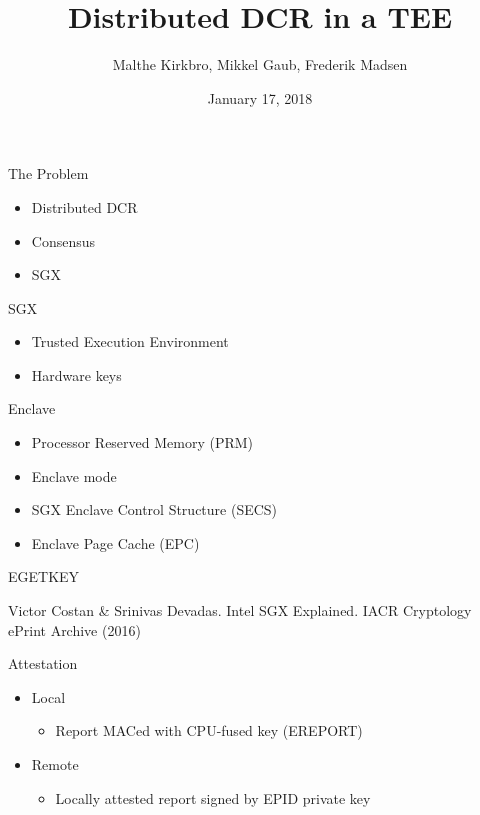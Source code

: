 \documentclass{beamer}
\title{Distributed DCR in a TEE}
\author{Malthe Kirkbro, Mikkel Gaub, Frederik Madsen}
\date{January 17, 2018}
\begin{document}


	\begin{frame}
		\maketitle
	\end{frame}

	\begin{frame}{The Problem} %
		\begin{itemize}
			\item Distributed DCR
			\item Consensus
			\item SGX
		\end{itemize}
	\end{frame}

	\begin{frame}{SGX} %
		\begin{itemize}
			\item Trusted Execution Environment
			\item Hardware keys
		\end{itemize}
	\end{frame}

	\begin{frame}{Enclave} %
		\begin{itemize}
			\item Processor Reserved Memory (PRM)
			\item Enclave mode
			\item SGX Enclave Control Structure (SECS)
			\item Enclave Page Cache (EPC)
		\end{itemize}
	\end{frame}

	\begin{frame}{EGETKEY}
		

		\center\fontsize{4pt}{1}\selectfont
		Victor Costan \& Srinivas Devadas. Intel SGX Explained. IACR Cryptology ePrint Archive (2016)
	\end{frame}

	\begin{frame}{Attestation} %
		\begin{itemize}
			\item Local
				\begin{itemize}
					\item Report MACed with CPU-fused key (EREPORT)
				\end{itemize}
			\item Remote
				\begin{itemize}
					\item Locally attested report signed by EPID private key
				\end{itemize}
		\end{itemize}
	\end{frame}
\end{document}
